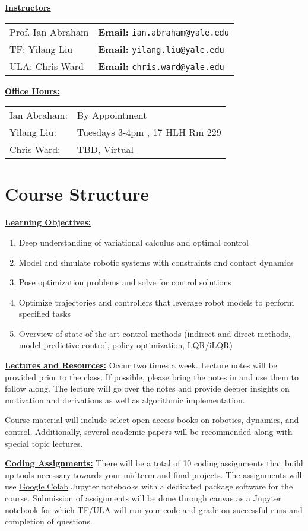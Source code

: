 \documentclass[11pt,letterpaper]{article}
\newcommand{\mysec}[1]{\medskip\noindent\underline{\textbf{#1}}}
\begin{document}
\mysec{Instructors} \\ 
\begin{tabular}{l l}
	Prof. Ian Abraham & \textbf{Email:} \texttt{ian.abraham@yale.edu} \\
	TF: Yilang Liu & \textbf{Email:} \texttt{yilang.liu@yale.edu}\\
	ULA: Chris Ward & \textbf{Email:} \texttt{chris.ward@yale.edu}
\end{tabular}

\mysec{Office Hours:} \\
\begin{tabular}{l l}
	Ian Abraham: & By Appointment \\
	Yilang Liu: & Tuesdays 3-4pm , 17 HLH Rm 229  \\ 
	Chris Ward: & TBD, Virtual
\end{tabular}

\section*{Course Structure}

\mysec{Learning Objectives:} 
\begin{enumerate}[noitemsep]
	\item Deep understanding of variational calculus and optimal control
	\item Model and simulate robotic systems with constraints and contact dynamics
	\item Pose optimization problems and solve for control solutions
	\item Optimize trajectories and controllers that leverage robot models to perform specified tasks
	\item Overview of state-of-the-art control methods (indirect and direct methods, model-predictive control, policy optimization, LQR/iLQR)
\end{enumerate}


\mysec{Lectures and Resources:} Occur two times a week. Lecture notes will be provided prior to the class. If possible, please bring the notes in and use them to follow along. The lecture will go over the notes and provide deeper insights on motivation and derivations as well as algorithmic implementation. 

Course material will include select open-access books on robotics, dynamics, and control. Additionally, several academic papers will be recommended along with special topic lectures.  


\mysec{Coding Assignments:} There will be a total of 10 coding assignments that build up tools necessary towards your midterm and final projects. The assignments will use \href{https://colab.research.google.com/?utm_source=scs-index}{Google Colab} Jupyter notebooks with a dedicated package software for the course. Submission of assignments will be done through canvas as a Jupyter notebook for which TF/ULA will run your code and grade on successful runs and completion of questions.
\end{document}

